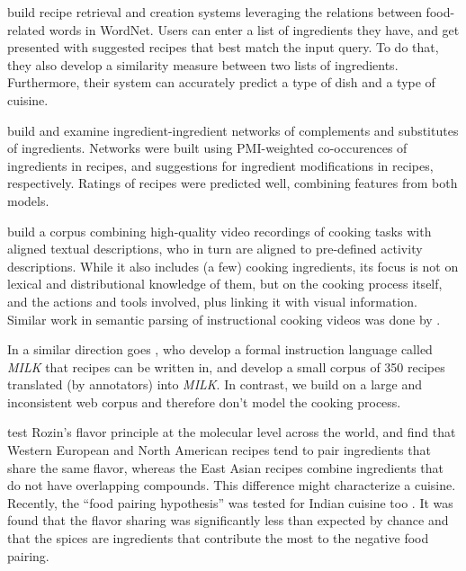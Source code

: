 \cite{zhang2008back} build recipe retrieval and creation systems leveraging the relations between food-related words in WordNet. Users can enter a list of ingredients they have, and get presented with suggested recipes that best match the input query. To do that, they also develop a similarity measure between two lists of ingredients. Furthermore, their system can accurately predict a type of dish and a type of cuisine.

\cite{teng2012recipe} build and examine ingredient-ingredient networks of complements and substitutes of ingredients. Networks were built using PMI-weighted co-occurences of ingredients in recipes, and suggestions for ingredient modifications in recipes, respectively. Ratings of recipes were predicted well, combining features from both models.


\cite{regneri2013grounding} build a corpus combining high-quality video recordings of cooking tasks with aligned textual descriptions, who in turn are aligned to pre-defined activity descriptions. While it also includes (a few) cooking ingredients, its focus is not on lexical and distributional knowledge of them, but on the cooking process itself, and the actions and tools involved, plus linking it with visual information. Similar work in semantic parsing of instructional cooking videos was done by \cite{malmaud2014cooking}.

In a similar direction goes \cite{tasse2008sour}, who develop a formal instruction language called \textit{MILK} that recipes can be written in, and develop a small corpus of 350 recipes translated (by annotators) into \textit{MILK}. In contrast, we build on a large and inconsistent web corpus and therefore don't model the cooking process.


\cite{ahn2011flavor} test Rozin's flavor principle \citep{rozin1973flavor} at the molecular level across the world, and find that Western European and North American recipes tend to pair ingredients that share the same flavor, whereas the East Asian recipes combine ingredients that do not have overlapping compounds. This difference might characterize a cuisine. Recently, the ``food pairing hypothesis'' was tested for Indian cuisine too \citep{2015arXiv150203815J}. It was found that the flavor sharing was significantly less than expected by chance and that the spices are ingredients that contribute the most to the negative food pairing. 
